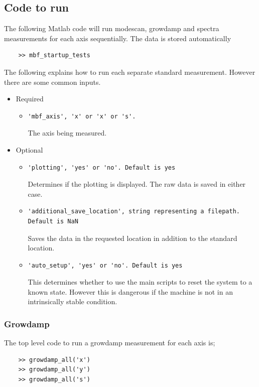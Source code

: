 \documentclass{report}
\begin{document}
\subsection{Code to run}

The following Matlab code will run modescan, growdamp and spectra measurements for each axis sequentially. The data is stored automatically 
\begin{verbatim}
    >> mbf_startup_tests 
\end{verbatim}
\vspace{2mm}
The following explains how to run each separate standard measurement. However there are some common inputs.
\begin{itemize}
    \item Required
    \begin{itemize}
        \item{\begin{verbatim}
'mbf_axis', 'x' or 'x' or 's'. 
\end{verbatim}
The axis being measured.}
        \end{itemize}
    \item Optional
    \begin{itemize}
        \item{\begin{verbatim}
'plotting', 'yes' or 'no'. Default is yes
\end{verbatim}
Determines if the plotting is displayed. The raw data is saved in either case.}
        \item{\begin{verbatim}
'additional_save_location', string representing a filepath. Default is NaN
\end{verbatim}
Saves the data in the requested location in addition to the standard location.}
        \item{\begin{verbatim}
'auto_setup', 'yes' or 'no'. Default is yes
\end{verbatim}
This determines whether to use the main scripts to reset the system to a known state. However this is dangerous if the machine is not in an intrinsically stable condition.}
    \end{itemize}
\end{itemize}

\subsubsection{Growdamp}
The top level code to run a growdamp measurement for each axis is; 
\begin{verbatim}
    >> growdamp_all('x') 
    >> growdamp_all('y') 
    >> growdamp_all('s') 
\end{verbatim}
\end{document}
